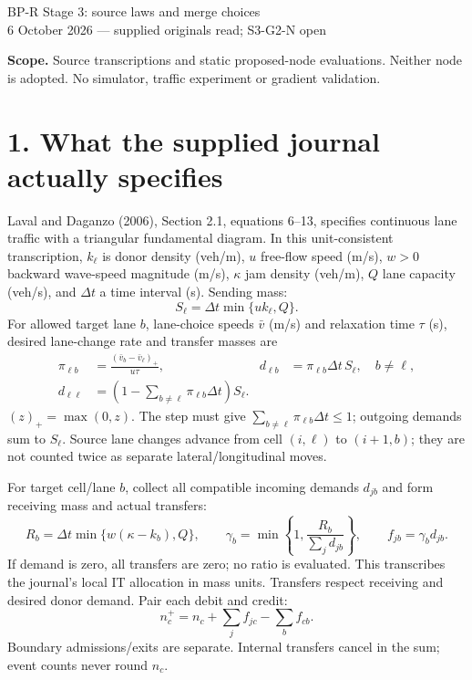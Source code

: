 \documentclass[11pt,a4paper]{article}
\begin{document}
\begin{center}
{\Large BP-R Stage 3: source laws and merge choices}\\[4pt]
6 October 2026 --- supplied originals read; S3-G2-N open
\end{center}
\textbf{Scope.} Source transcriptions and static proposed-node evaluations.
Neither node is adopted. No simulator, traffic experiment or gradient validation.

\section*{1. What the supplied journal actually specifies}
Laval and Daganzo (2006), Section 2.1, equations 6--13, specifies continuous
lane traffic with a triangular fundamental diagram. In this unit-consistent
transcription, $k_\ell$ is donor density (veh/m), $u$ free-flow speed (m/s),
$w>0$ backward wave-speed magnitude (m/s), $\kappa$ jam density (veh/m),
$Q$ lane capacity (veh/s), and $\Delta t$ a time interval (s). Sending mass:
\begin{equation}
S_\ell=\Delta t\min\{u k_\ell,Q\}.
\end{equation}
For allowed target lane $b$, lane-choice speeds $\bar v$ (m/s) and relaxation
time $\tau$ (s), desired lane-change rate and transfer masses are
\begin{align}
\pi_{\ell b}&=\frac{(\bar v_b-\bar v_\ell)_+}{u\tau},&
d_{\ell b}&=\pi_{\ell b}\Delta t\,S_\ell,\quad b\ne\ell,\\
d_{\ell\ell}&=\left(1-\sum_{b\ne\ell}\pi_{\ell b}\Delta t\right)S_\ell.
\end{align}
$(z)_+=\max(0,z)$. The step must give
$\sum_{b\ne\ell}\pi_{\ell b}\Delta t\le1$; outgoing demands sum to $S_\ell$.
Source lane changes advance from cell $(i,\ell)$ to $(i+1,b)$;
they are not counted twice as separate lateral/longitudinal moves.

For target cell/lane $b$, collect all compatible incoming demands $d_{jb}$
and form receiving mass and actual transfers:
\begin{equation}
R_b=\Delta t\min\{w(\kappa-k_b),Q\},\qquad
\gamma_b=\min\left\{1,\frac{R_b}{\sum_jd_{jb}}\right\},\qquad
f_{jb}=\gamma_b d_{jb}.
\end{equation}
If demand is zero, all transfers are zero; no ratio is evaluated. This
transcribes the journal's local IT allocation in mass units. Transfers respect
receiving and desired donor demand. Pair each debit and credit:
\begin{equation}
n_c^{+}=n_c+\sum_j f_{jc}-\sum_b f_{cb}.
\end{equation}
Boundary admissions/exits are separate. Internal transfers cancel in the sum;
event counts never round $n_c$.
\end{document}
